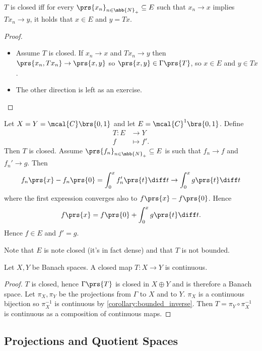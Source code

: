 \documentclass[10pt, twoside]{book}
\begin{document}
\begin{proposition}
$T$ is closed iff for every $\prs{x_n}_{n \in \mbb{N}_+} \subseteq E$ such that $x_n \to x$ implies $T x_n \to y$, it holds that $x \in E$ and $y = Tx$.
\end{proposition}

\begin{proof}
\begin{itemize}
\item Assume $T$ is closed.
If $x_n \to x$ and $T x_n \to y$ then $\prs{x_n, T x_n} \to \prs{x,y}$ so $\prs{x,y} \in \Gamma\prs{T}$, so $x \in E$ and $y \in Tx$.
\item The other direction is left as an exercise.
\end{itemize}
\end{proof}

\begin{example}
Let $X=Y = \mcal{C}\brs{0,1}$ and let $E = \mcal{C}^1\brs{0,1}$.
Define
\begin{align*}
T \colon E &\to Y \\
f &\mapsto f' \text{.}
\end{align*}
Then $T$ is closed. Assume $\prs{f_n}_{n \in \mbb{N}_+} \subseteq E$ is such that $f_n \to f$ and $f_n' \to g$. Then
\[f_n\prs{x} - f_n\prs{0} = \int_0^x f_n'\prs{t} \diff t \to \int_0^x g\prs{t} \diff t\]
where the first expression converges also to $f\prs{x} - f\prs{0}$.
Hence
\[f\prs{x} = f\prs{0} + \int_0^x g\prs{t} \diff t \text{.}\]
Hence $f \in E$ and $f' = g$.

Note that $E$ is note closed (it's in fact dense) and that $T$ is not bounded.
\end{example}

\begin{theorem}
Let $X,Y$ be Banach spaces. A closed map $T \colon X \to Y$ is continuous.
\end{theorem}

\begin{proof}
$T$ is closed, hence $\Gamma\prs{T}$ is closed in $X \oplus Y$ and is therefore a Banach space. Let $\pi_X, \pi_Y$ be the projections from $\Gamma$ to $X$ and to $Y$. $\pi_X$ is a continuous bijection so $\pi_X^{-1}$ is continuous by \ref{corollary:bounded_inverse}. Then
$T = \pi_Y \circ \pi_X^{-1}$ is continuous as a composition of continuous maps.
\end{proof}

\subsection{Projections and Quotient Spaces}
\end{document}
